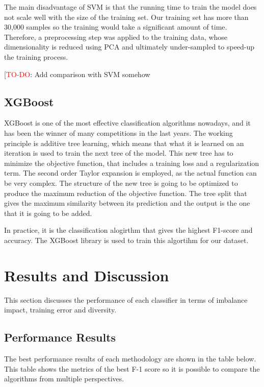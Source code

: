 \documentclass[conference]{IEEEtran}
\begin{document}
The main disadvantage of SVM is that the running time to train the model does not scale well with the size of the training set\cite{boosting_svm}. Our training set has more than 30,000 samples so the training would take a significant amount of time. Therefore, a preprocessing step was applied to the training data, whose dimensionality is reduced using PCA and ultimately under-sampled to speed-up the training process. 

[\textcolor{red}{TO-DO}: Add comparison with SVM somehow

\subsection{XGBoost}
XGBoost is one of the most effective classification algorithms nowadays, and it has been the winner of many competitions in the last years. The working principle is additive tree learning, which means that what it is learned on an iteration is used to train the next tree of the model. This new tree has to minimize the objective function, that includes a training loss and a regularization term. The second order Taylor expansion is employed, as the actual function can be very complex. The structure of the new tree is going to be optimized to produce the maximum reduction of the objective function. The tree split that gives the maximum similarity between its prediction and the output is the one that it is going to be added. 

In practice, it is the classification alogirthm that gives the highest F1-score and accuracy. The XGBoost library is used to train this algortihm for our dataset.

\section{Results and Discussion}
This section discusses the performance of each classifier in terms of imbalance impact, training error and diversity.

\subsection{Performance Results}

The best performance results of each methodology are shown in the table below. This table shows the metrics of the best F-1 score so it is possible to compare the algorithms from multiple perspectives.
\end{document}
